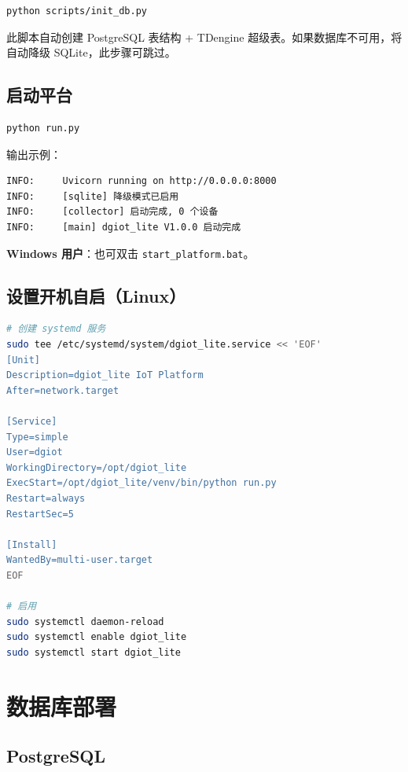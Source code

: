 \documentclass[12pt,a4paper]{ctexart}
\begin{document}
\begin{lstlisting}[language=bash]
python scripts/init_db.py
\end{lstlisting}

\noindent 此脚本自动创建 PostgreSQL 表结构 + TDengine 超级表。如果数据库不可用，将自动降级 SQLite，此步骤可跳过。

\subsection{启动平台}

\begin{lstlisting}[language=bash]
python run.py
\end{lstlisting}

输出示例：
\begin{lstlisting}
INFO:     Uvicorn running on http://0.0.0.0:8000
INFO:     [sqlite] 降级模式已启用
INFO:     [collector] 启动完成, 0 个设备
INFO:     [main] dgiot_lite V1.0.0 启动完成
\end{lstlisting}

\noindent\textbf{Windows 用户}：也可双击 \texttt{start\_platform.bat}。

\subsection{设置开机自启（Linux）}

\begin{lstlisting}[language=bash]
# 创建 systemd 服务
sudo tee /etc/systemd/system/dgiot_lite.service << 'EOF'
[Unit]
Description=dgiot_lite IoT Platform
After=network.target

[Service]
Type=simple
User=dgiot
WorkingDirectory=/opt/dgiot_lite
ExecStart=/opt/dgiot_lite/venv/bin/python run.py
Restart=always
RestartSec=5

[Install]
WantedBy=multi-user.target
EOF

# 启用
sudo systemctl daemon-reload
sudo systemctl enable dgiot_lite
sudo systemctl start dgiot_lite
\end{lstlisting}

\section{数据库部署}

\subsection{PostgreSQL}
\end{document}
